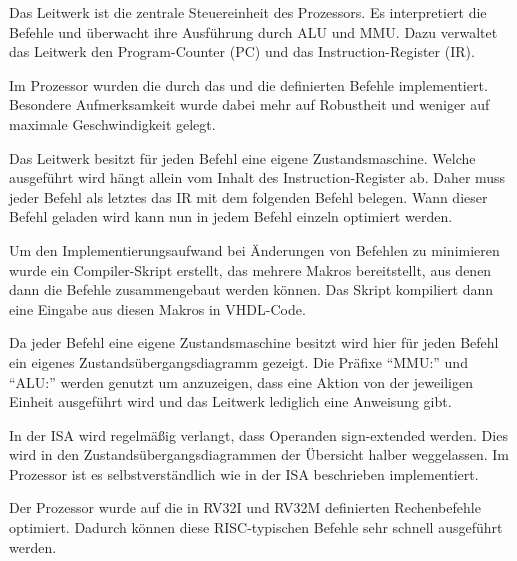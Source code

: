 Das Leitwerk ist die zentrale Steuereinheit des Prozessors. Es interpretiert
die Befehle und \"uberwacht ihre Ausf\"uhrung durch ALU und MMU. Dazu verwaltet
das Leitwerk den Program-Counter (PC) und das Instruction-Register (IR).

Im Prozessor wurden die durch das 
und die  definierten Befehle implementiert. Besondere Aufmerksamkeit wurde
dabei mehr auf Robustheit und weniger auf maximale Geschwindigkeit gelegt.

Das Leitwerk besitzt f\"ur jeden Befehl eine eigene Zustandsmaschine. Welche
ausgef\"uhrt wird h\"angt allein vom Inhalt des Instruction-Register ab. Daher
muss jeder Befehl als letztes das IR mit dem folgenden Befehl belegen. Wann
dieser Befehl geladen wird kann nun in jedem Befehl einzeln optimiert werden.

Um den Implementierungsaufwand bei \"Anderungen von Befehlen zu minimieren
wurde ein Compiler-Skript erstellt, das mehrere Makros bereitstellt, aus denen
dann die Befehle zusammengebaut werden k\"onnen. Das Skript kompiliert dann
eine Eingabe aus diesen Makros in VHDL-Code.

Da jeder Befehl eine eigene Zustandsmaschine besitzt wird hier f\"ur jeden
Befehl ein eigenes Zustands\-\"uber\-gangs\-dia\-gramm gezeigt. Die Pr\"afixe
``MMU:'' und ``ALU:'' werden genutzt um anzuzeigen, dass eine Aktion von der
jeweiligen Einheit ausgef\"uhrt wird und das Leitwerk lediglich eine Anweisung
gibt.

In der ISA wird regelm\"a\ss{}ig verlangt, dass Operanden sign-extended werden.
Dies wird in den Zustands\-\"uber\-gangs\-dia\-grammen der \"Ubersicht halber
weggelassen. Im Prozessor ist es selbstverst\"andlich wie in der ISA
beschrieben implementiert.

Der Prozessor wurde auf die in RV32I und RV32M definierten Rechenbefehle
optimiert. Dadurch k\"onnen diese RISC-typischen Befehle sehr schnell
ausgef\"uhrt werden.


